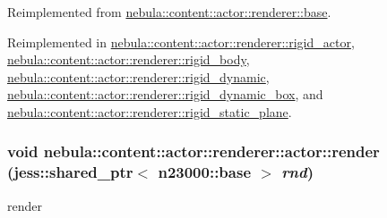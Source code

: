 Reimplemented from \hyperlink{classnebula_1_1content_1_1actor_1_1renderer_1_1base_a8cb55e87ac866ad14c7e1d03077681a9}{nebula::content::actor::renderer::base}.

Reimplemented in \hyperlink{classnebula_1_1content_1_1actor_1_1renderer_1_1rigid__actor_a595700dbe653ae7c64b01ad332065725}{nebula::content::actor::renderer::rigid\_\-actor}, \hyperlink{classnebula_1_1content_1_1actor_1_1renderer_1_1rigid__body_a448e47741d24ba24fbedbd7438159a12}{nebula::content::actor::renderer::rigid\_\-body}, \hyperlink{classnebula_1_1content_1_1actor_1_1renderer_1_1rigid__dynamic_ae90eb12e9f68833bd1bf0b8360332f49}{nebula::content::actor::renderer::rigid\_\-dynamic}, \hyperlink{classnebula_1_1content_1_1actor_1_1renderer_1_1rigid__dynamic__box_a26efbc775da4307f9294dab260b43723}{nebula::content::actor::renderer::rigid\_\-dynamic\_\-box}, and \hyperlink{classnebula_1_1content_1_1actor_1_1renderer_1_1rigid__static__plane_a6038d69ad558ad5bfa9e52a7f01afd0b}{nebula::content::actor::renderer::rigid\_\-static\_\-plane}.\hypertarget{classnebula_1_1content_1_1actor_1_1renderer_1_1actor_ab54b9148460295b161e12a2e6b3573d0}{
\subsubsection[{render}]{\setlength{\rightskip}{0pt plus 5cm}void nebula::content::actor::renderer::actor::render (jess::shared\_\-ptr$<$ {\bf n23000::base} $>$ {\em rnd})}}
\label{classnebula_1_1content_1_1actor_1_1renderer_1_1actor_ab54b9148460295b161e12a2e6b3573d0}


render 

